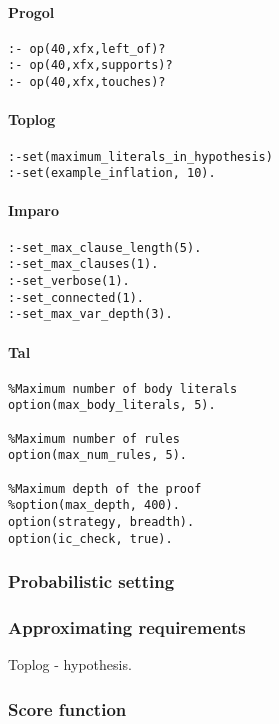 \paragraph{Progol}
\begin{lstlisting}
:- op(40,xfx,left_of)?
:- op(40,xfx,supports)?
:- op(40,xfx,touches)?
\end{lstlisting}

\paragraph{Toplog}
\begin{lstlisting}
:-set(maximum_literals_in_hypothesis)
:-set(example_inflation, 10).
\end{lstlisting}

\paragraph{Imparo}
\begin{lstlisting}
:-set_max_clause_length(5).
:-set_max_clauses(1).
:-set_verbose(1).
:-set_connected(1).
:-set_max_var_depth(3).
\end{lstlisting}

\paragraph{Tal}
\begin{lstlisting}
%Maximum number of body literals
option(max_body_literals, 5).

%Maximum number of rules
option(max_num_rules, 5).

%Maximum depth of the proof
%option(max_depth, 400).
option(strategy, breadth).
option(ic_check, true).
\end{lstlisting}

\subsubsection{Probabilistic setting}

\subsubsection{Approximating requirements}
Toplog - hypothesis.

\subsubsection{Score function}

